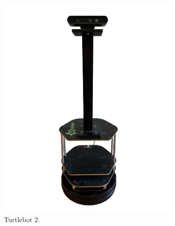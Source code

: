 \begin{figure}
    \centering
    \begin{subfigure}[b]{0.4\textwidth}
        \includegraphics[width=\textwidth,trim=3cm 0cm 3cm 0cm, clip]{figures/ros4vsn/turtlebot_2}
        \caption{Turtlebot 2.}
        \label{fig:robot_turtlebot}
    \end{subfigure}
    ~
    \begin{subfigure}[b]{0.4\textwidth}

\end{subfigure}
\end{figure}
